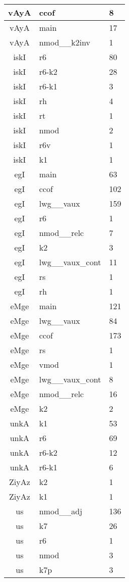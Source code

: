 \documentclass[a4 paper]{article}
\begin{document}
\begin{longtable}{cp{}p{}}
vAyA & ccof & 8\\ \midrule vAyA & main & 17\\ \midrule vAyA & nmod\_\_k2inv & 1\\ \midrule 
iskI & r6 & 80\\ \midrule iskI & r6-k2 & 28\\ \midrule iskI & r6-k1 & 3\\ \midrule iskI & rh & 4\\ \midrule iskI & rt & 1\\ \midrule iskI & nmod & 2\\ \midrule iskI & r6v & 1\\ \midrule iskI & k1 & 1\\ \midrule 
egI & main & 63\\ \midrule egI & ccof & 102\\ \midrule egI & lwg\_\_vaux & 159\\ \midrule egI & r6 & 1\\ \midrule egI & nmod\_\_relc & 7\\ \midrule egI & k2 & 3\\ \midrule egI & lwg\_\_vaux\_cont & 11\\ \midrule egI & rs & 1\\ \midrule egI & rh & 1\\ \midrule 
eMge & main & 121\\ \midrule eMge & lwg\_\_vaux & 84\\ \midrule eMge & ccof & 173\\ \midrule eMge & rs & 1\\ \midrule eMge & vmod & 1\\ \midrule eMge & lwg\_\_vaux\_cont & 8\\ \midrule eMge & nmod\_\_relc & 16\\ \midrule eMge & k2 & 2\\ \midrule 
unkA & k1 & 53\\ \midrule unkA & r6 & 69\\ \midrule unkA & r6-k2 & 12\\ \midrule unkA & r6-k1 & 6\\ \midrule 
ZiyAz & k2 & 1\\ \midrule ZiyAz & k1 & 1\\ \midrule 
us & nmod\_\_adj & 136\\ \midrule us & k7 & 26\\ \midrule us & r6 & 1\\ \midrule us & nmod & 3\\ \midrule us & k7p & 3\\ \midrule 

\end{longtable}
\end{document}
